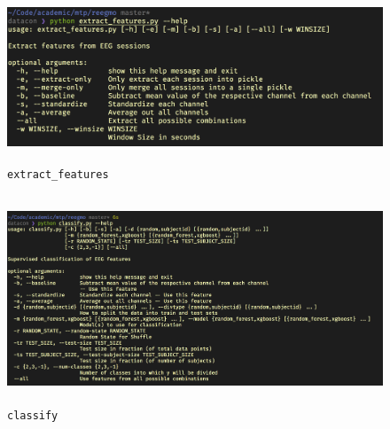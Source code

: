 \begin{figure}[H]
\centering
\includegraphics[height=5cm]{Figures/extract_features_help.png}
\caption{\texttt{extract\_features}}
\label{fig23}
\end{figure}

\begin{figure}[H]
\centering
\includegraphics[height=6.2cm]{Figures/classify_help.png}
\caption{\texttt{classify}}
\label{fig23}
\end{figure}
